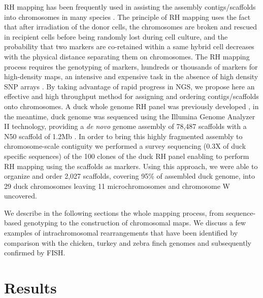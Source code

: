 \documentclass[10pt,letterpaper]{article}
\begin{document}
RH mapping has been frequently used in assisting the assembly contigs/scaffolds into chromosomes in many species \cite{Lindblad-Toh2005,Green2007,Servin2012a}. The principle of RH mapping uses the fact that after irradiation of the donor cells, the chromosomes are broken and rescued in recipient cells before being randomly lost during cell culture, and the probability that two markers are co-retained within a same hybrid cell decreases with the physical distance separating them on chromosomes. 
The RH mapping process requires the genotyping of markers, hundreds or thousands of markers for high-density maps, an intensive and expensive task in the absence of high density SNP arrays \cite{Faraut2009}. 
By taking advantage of rapid progress in NGS, we propose here an effective and high throughput method for assigning and ordering contigs/scaffolds onto chromosomes.
A duck whole genome RH panel was previously developed \cite{Rao2012}, in the meantime, duck genome was sequenced using the Illumina Genome Analyzer II technology, providing a {\em de novo} genome assembly of 78,487 scaffolds with a N50 scaffold of 1.2Mb \cite{Huang2013}. 
In order to bring this highly fragmented assembly to chromosome-scale contiguity we performed a survey sequencing (0.3X of duck specific sequences) of the 100 clones of the duck RH panel enabling to perform RH mapping using the scaffolds as markers.  
Using this approach, we were able to organize and order 2,027 scaffolds, covering 95\% of assembled duck genome, into 29 duck chromosomes leaving 11 microchromosomes and chromosome W uncovered.

We describe in the following sections the whole mapping process, from sequence-based genotyping to the construction of chromosomal maps. 
We discuss a few examples of intrachromosomal rearrangements that have been identified by comparison with the chicken, turkey and zebra finch genomes and subsequently confirmed by FISH.

\section*{Results}
\end{document}
